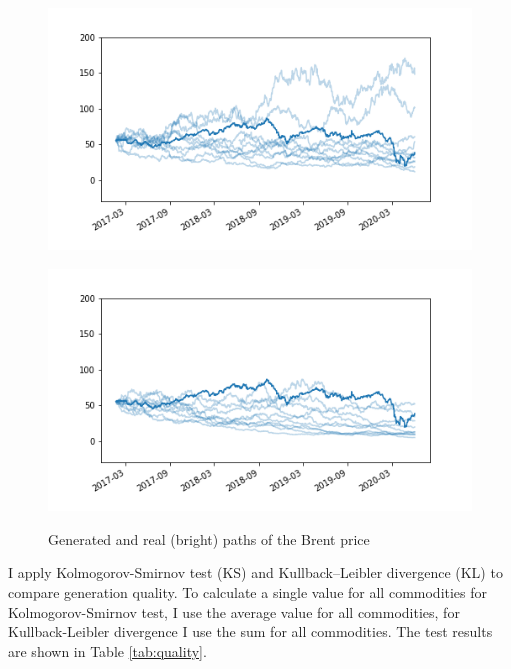 \documentclass{article}
\begin{document}
\begin{figure}[!ht]
\begin{center}
        \begin{minipage}{.5\linewidth}
            \centering
            \includegraphics[width=\textwidth]{pics/path_t_copulaKDE.png}
            \label{fig:t_copulaKDE_path}
        \end{minipage}%
        \begin{minipage}{.5\linewidth}
            \centering
            \includegraphics[width=\textwidth]{pics/path_tgan.png}
            \label{fig:tgan_path}
        \end{minipage}
        \caption{Generated and real (bright) paths of the Brent price}
        \label{fig:paths}
    \end{center}
\end{figure}

I apply Kolmogorov-Smirnov test (KS) and Kullback–Leibler divergence (KL) to compare generation quality. To calculate a single value for all commodities for Kolmogorov-Smirnov test, I use the average value for all commodities, for Kullback-Leibler divergence I use the sum for all commodities. The test results are shown in Table \ref{tab:quality}.
\end{document}

